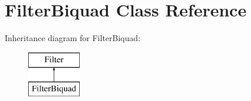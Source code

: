 \hypertarget{class_filter_biquad}{\section{Filter\-Biquad Class Reference}
\label{class_filter_biquad}
}
Inheritance diagram for Filter\-Biquad\-:\begin{figure}[H]
\begin{center}
\leavevmode
\includegraphics[height=2.000000cm]{class_filter_biquad}
\end{center}
\end{figure}
